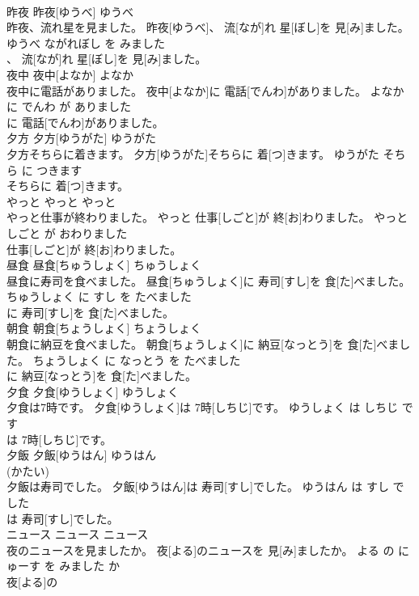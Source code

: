 \documentclass[8pt]{extreport}
\begin{document}
\begin{CJK}{UTF8}{min}
\\	昨夜	昨夜[ゆうべ]	ゆうべ	
\\	昨夜、流れ星を見ました。	昨夜[ゆうべ]、 流[なが]れ 星[ぼし]を 見[み]ました。	ゆうべ ながれぼし を みました	
\\	、 流[なが]れ 星[ぼし]を 見[み]ました。		
\\	夜中	夜中[よなか]	よなか	
\\	夜中に電話がありました。	夜中[よなか]に 電話[でんわ]がありました。	よなか に でんわ が ありました	
\\	に 電話[でんわ]がありました。		
\\	夕方	夕方[ゆうがた]	ゆうがた	
\\	夕方そちらに着きます。	夕方[ゆうがた]そちらに 着[つ]きます。	ゆうがた そちら に つきます	
\\	そちらに 着[つ]きます。		
\\	やっと	やっと	やっと	
\\	やっと仕事が終わりました。	やっと 仕事[しごと]が 終[お]わりました。	やっと しごと が おわりました	
\\	仕事[しごと]が 終[お]わりました。		
\\	昼食	昼食[ちゅうしょく]	ちゅうしょく	
\\	昼食に寿司を食べました。	昼食[ちゅうしょく]に 寿司[すし]を 食[た]べました。	ちゅうしょく に すし を たべました	
\\	に 寿司[すし]を 食[た]べました。		
\\	朝食	朝食[ちょうしょく]	ちょうしょく	
\\	朝食に納豆を食べました。	朝食[ちょうしょく]に 納豆[なっとう]を 食[た]べました。	ちょうしょく に なっとう を たべました	
\\	に 納豆[なっとう]を 食[た]べました。		
\\	夕食	夕食[ゆうしょく]	ゆうしょく	
\\	夕食は7時です。	夕食[ゆうしょく]は 7時[しちじ]です。	ゆうしょく は しちじ です	
\\	は 7時[しちじ]です。		
\\	夕飯	夕飯[ゆうはん]	ゆうはん	
\\	(かたい)		
\\	夕飯は寿司でした。	夕飯[ゆうはん]は 寿司[すし]でした。	ゆうはん は すし でした	
\\	は 寿司[すし]でした。		
\\	ニュース	ニュース	ニュース	
\\	夜のニュースを見ましたか。	夜[よる]のニュースを 見[み]ましたか。	よる の にゅーす を みました か	
\\	夜[よる]の

\end{CJK}
\end{document}
